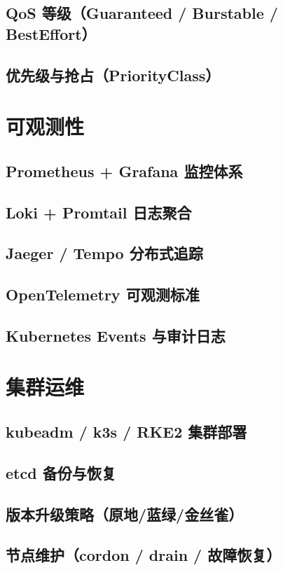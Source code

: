 \documentclass[12pt,UTF8]{ctexbook}
\begin{document}
    \subsection{QoS 等级（Guaranteed / Burstable / BestEffort）}
    \subsection{优先级与抢占（PriorityClass）}

  \section{可观测性}
    \subsection{Prometheus + Grafana 监控体系}
    \subsection{Loki + Promtail 日志聚合}
    \subsection{Jaeger / Tempo 分布式追踪}
    \subsection{OpenTelemetry 可观测标准}
    \subsection{Kubernetes Events 与审计日志}

  \section{集群运维}
    \subsection{kubeadm / k3s / RKE2 集群部署}
    \subsection{etcd 备份与恢复}
    \subsection{版本升级策略（原地/蓝绿/金丝雀）}
    \subsection{节点维护（cordon / drain / 故障恢复）}
\end{document}
